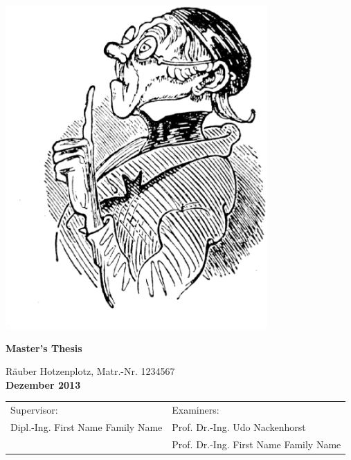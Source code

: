 \begin{titlepage}
\begin{center}
\includegraphics[width=0.75\textwidth]{pics/title_pic.eps}

{\Large \bf Master's Thesis}

\vspace{0.5cm}

{Räuber Hotzenplotz, Matr.-Nr. 1234567} \\
\textbf{Dezember 2013}

\vfill

{\begin{tabular}{ll}
  Supervisor: \hspace{6cm} & Examiners: \\
  Dipl.-Ing. First Name Family Name & Prof. Dr.-Ing. Udo Nackenhorst \\
                                    & Prof. Dr.-Ing. First Name Family Name \\
\end{tabular}}
\end{center}
\end{titlepage}
